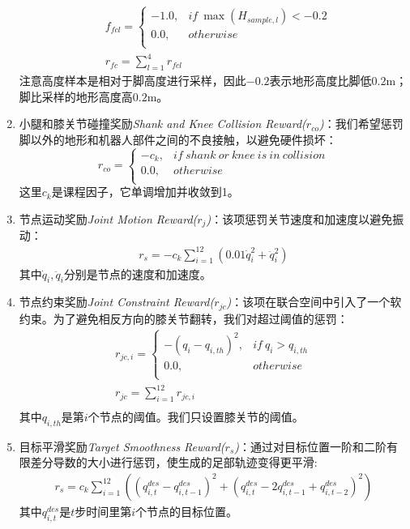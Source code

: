 \begin{enumerate}
\begin{align}
      &f_{fcl}=
      \begin{cases}
      -1.0, & if\ \max(H_{sample,l})<-0.2\\
      0.0, &otherwise\\
      \end{cases}\\
      &r_{fc}=\sum_{l=1}^{4}r_{fcl}
    \end{align}注意高度样本是相对于脚高度进行采样，因此$-0.2$表示地形高度比脚低$0.2$m；脚比采样的地形高度高$0.2$m。
    \item 小腿和膝关节碰撞奖励\emph{Shank and Knee Collision Reward($r_{co}$)}：我们希望惩罚脚以外的地形和机器人部件之间的不良接触，以避免硬件损坏：$$r_{co}=\begin{cases}
      -c_k, & if\ shank\ or\ knee\ is\ in\ collision\\
      0.0, & otherwise\\
    \end{cases}$$这里$c_k$是课程因子，它单调增加并收敛到1。
    \item 节点运动奖励\emph{Joint Motion Reward($r_{j}$)}：该项惩罚关节速度和加速度以避免振动：\begin{align}
      r_s=-c_k\sum_{i=1}^{12}(0.01\dot q_i^2+\ddot q_i^2)
    \end{align}其中$\dot q_i, \ddot q_i$分别是节点的速度和加速度。
    \item 节点约束奖励\emph{Joint Constraint Reward($r_{jc}$)}：该项在联合空间中引入了一个软约束。为了避免相反方向的膝关节翻转，我们对超过阈值的惩罚：\begin{align}
      r_{jc,i}=\begin{cases}
        -(q_i-q_{i,th})^2, & if\ q_i>q_{i,th}\\
        0.0, & otherwise\\
      \end{cases}\\
      r_{jc}=\sum_{i=1}^{12}r_{jc,i}\\
    \end{align}其中$q_{i,th}$是第$i$个节点的阈值。我们只设置膝关节的阈值。
    \item 目标平滑奖励\emph{Target Smoothness Reward($r_{s}$)}：通过对目标位置一阶和二阶有限差分导数的大小进行惩罚，使生成的足部轨迹变得更平滑:\begin{align}
      r_s=c_k\sum_{i=1}^{12}((q_{i,t}^{des}-q_{i,t-1}^{des})^2+(q_{i,t}^{des}-2q_{i,t-1}^{des}+q_{i,t-2}^{des})^2)
    \end{align}其中$q_{i,t}^{des}$是$t$步时间里第$i$个节点的目标位置。

\end{enumerate}
